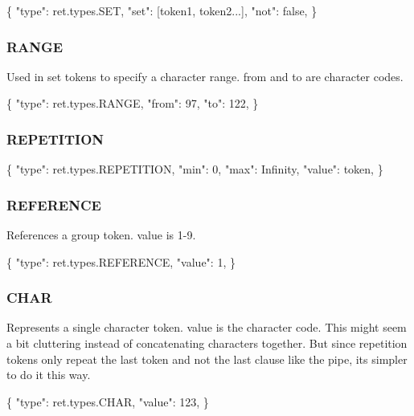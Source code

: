 \begin{DoxyCode}
\{
  "type": ret.types.SET,
  "set": [token1, token2...],
  "not": false,
\}
\end{DoxyCode}


\subsubsection*{R\+A\+N\+GE}

Used in set tokens to specify a character range. {\ttfamily from} and {\ttfamily to} are character codes.


\begin{DoxyCode}
\{
  "type": ret.types.RANGE,
  "from": 97,
  "to": 122,
\}
\end{DoxyCode}


\subsubsection*{R\+E\+P\+E\+T\+I\+T\+I\+ON}


\begin{DoxyCode}
\{
  "type": ret.types.REPETITION,
  "min": 0,
  "max": Infinity,
  "value": token,
\}
\end{DoxyCode}


\subsubsection*{R\+E\+F\+E\+R\+E\+N\+CE}

References a group token. {\ttfamily value} is 1-\/9.


\begin{DoxyCode}
\{
  "type": ret.types.REFERENCE,
  "value": 1,
\}
\end{DoxyCode}


\subsubsection*{C\+H\+AR}

Represents a single character token. {\ttfamily value} is the character code. This might seem a bit cluttering instead of concatenating characters together. But since repetition tokens only repeat the last token and not the last clause like the pipe, it\textquotesingle{}s simpler to do it this way.


\begin{DoxyCode}
\{
  "type": ret.types.CHAR,
  "value": 123,
\}
\end{DoxyCode}


